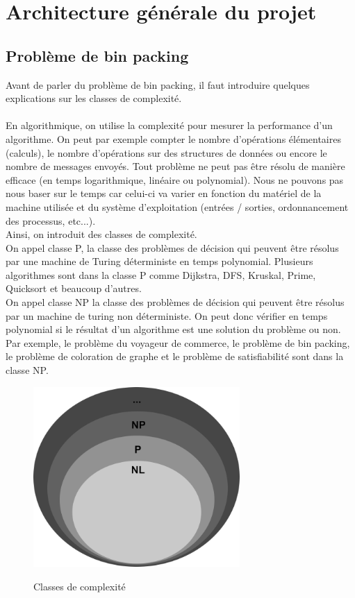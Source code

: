 \documentclass[14pt]{extarticle}
\begin{document}
\section{Architecture générale du projet}
    \subsection{Problème de bin packing}
    Avant de parler du problème de bin packing, il faut introduire quelques explications sur les classes de complexité.\\
    \\
    En algorithmique, on utilise la complexité pour mesurer la performance d'un algorithme. On peut par exemple compter le nombre d'opérations élémentaires (calculs), le nombre d'opérations sur des structures de données ou encore le nombre de messages envoyés. Tout problème ne peut pas être résolu de manière efficace (en temps logarithmique, linéaire ou polynomial). Nous ne pouvons pas nous baser sur le temps car celui-ci va varier en fonction du matériel de la machine utilisée et du système d'exploitation (entrées / sorties, ordonnancement des processus, etc...).\\
    Ainsi, on introduit des classes de complexité.\\
    On appel classe P, la classe des problèmes de décision qui peuvent être résolus par une machine de Turing déterministe en temps polynomial. Plusieurs algorithmes sont dans la classe P comme Dijkstra, DFS, Kruskal, Prime, Quicksort et beaucoup d'autres.\\
    On appel classe NP la classe des problèmes de décision qui peuvent être résolus par un machine de turing non déterministe. On peut donc vérifier en temps polynomial si le résultat d'un algorithme est une solution du problème ou non. Par exemple, le problème du voyageur de commerce, le problème de bin packing, le problème de coloration de graphe et le problème de satisfiabilité sont dans la classe NP.
    \newpage
    \begin{figure}[!h]
        \centering
        \includegraphics[width=0.7\textwidth]{img/classe_complexite.png}
        \label{Classes de complexité}
        \caption{Classes de complexité}
    \end{figure}
\end{document}
